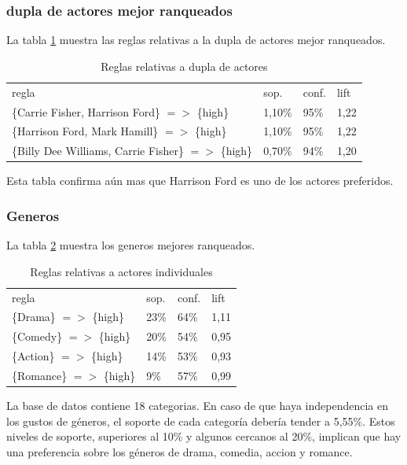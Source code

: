 \documentclass[journal]{IEEEtran}
\begin{document}
\subsubsection{dupla de actores mejor ranqueados}
La tabla \ref{table_best_tuple}   muestra las reglas relativas a la 
dupla de  actores mejor ranqueados.
\begin{table}[ht!]
\caption{Reglas relativas a dupla de actores}
\label{table_best_tuple}
\centering
\begin{tabular}{l l l l }
regla & sop. & conf. & lift \\
\{Carrie Fisher, Harrison Ford\} $=$$>$ \{high\} & 1,10\% & 95\% & 1,22 \\
\{Harrison Ford, Mark Hamill\} $=$$>$ \{high\} & 1,10\% & 95\% & 1,22 \\
\{Billy Dee Williams, Carrie Fisher\} $=$$>$ \{high\} & 0,70\% & 94\% & 1,20 \\
\end{tabular}
\end{table}

Esta tabla confirma aún mas que Harrison Ford es uno de los actores preferidos.

\subsubsection{Generos}
La tabla \ref{table_genre} muestra los generos mejores ranqueados.
\begin{table}[ht!]
\caption{Reglas relativas a actores individuales}
\label{table_genre}
\centering
\begin{tabular}{l l l l }
regla & sop. & conf. & lift \\
\{Drama\} $=$$>$ \{high\} & 23\% & 64\% & 1,11 \\
\{Comedy\} $=$$>$ \{high\} & 20\% & 54\% & 0,95 \\
\{Action\} $=$$>$ \{high\} & 14\% & 53\% & 0,93 \\
\{Romance\} $=$$>$ \{high\} & 9\% & 57\% & 0,99 \\
\end{tabular}
\end{table}

La base de datos contiene 18 categorias. En caso de que haya independencia en 
los gustos de géneros, el soporte de cada categoría debería tender a 5,55\%. 
Estos niveles de soporte, superiores al 10\% y algunos cercanos al 20\%,
implican que hay una preferencia sobre los géneros de drama, comedia,
accion y romance.
\end{document}
